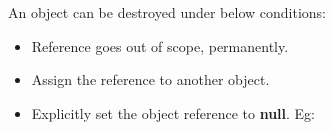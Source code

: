 \setlength{\columnsep}{3pt}
\begin{flushleft}

	An object can be destroyed under below conditions:	
		\begin{itemize}
			\item Reference goes out of scope, permanently.
			\item Assign the reference to another object.
			\item Explicitly set the object reference to \textbf{null}.
			\newline
			Eg:
			\bigskip
		\end{itemize}
	
	
\end{flushleft}
